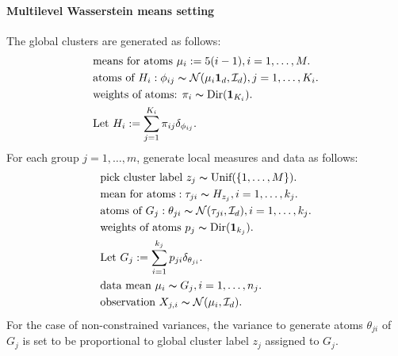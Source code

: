 \paragraph{Multilevel Wasserstein means setting}
The global clusters are generated as follows:
\begin{eqnarray*}
\left.\begin{aligned}
& \text{means for atoms } \mu_i := 5(i-1), i=1,\ldots, M. \\
& \text{atoms of } H_i: \phi_{ij} \thicksim \mathcal{N}(\mu_i \vec{1}_d, \mathcal{I}_d), j=1,\ldots, K_i.\\
& \text{weights of atoms: } \pi_i \thicksim \text{Dir}(\vec{1}_{K_i}). \\
& \text{Let } H_i := \sum_{j=1}^{K_i} \pi_{ij}\delta_{\phi_{ij}}.
\end{aligned}\right.
\end{eqnarray*}
For each group $j=1,\ldots,m$, generate local measures and data as follows:
\begin{eqnarray*}
\left.\begin{aligned}
& \text{pick cluster label } z_j \thicksim \text{Unif}( \{1,\ldots, M\}).\\
& \text{mean for atoms}: \tau_{ji} \thicksim H_{z_j}, i=1,\ldots, k_j.\\
& \text{atoms of } G_j: \theta_{ji} \thicksim \mathcal{N}(\tau_{ji},\mathcal{I}_d), i=1,\ldots, k_j.\\
& \text{weights of atoms } p_j \thicksim \text{Dir}(\vec{1}_{k_j}). \\
& \text{Let } G_j := \sum_{i=1}^{k_j} p_{ji}\delta_{\theta_{ji}}. \\
& \text{data mean } \mu_i \thicksim G_j, i=1,\ldots, n_j. \\
& \text{observation } X_{j,i} \thicksim \mathcal{N}(\mu_i,\mathcal{I}_d).
\end{aligned}\right.
\end{eqnarray*}
For the case of non-constrained variances, 
the variance to generate atoms $\theta_{ji}$ of $G_{j}$ is set to be proportional to global cluster label $z_{j}$ assigned to $G_{j}$.

